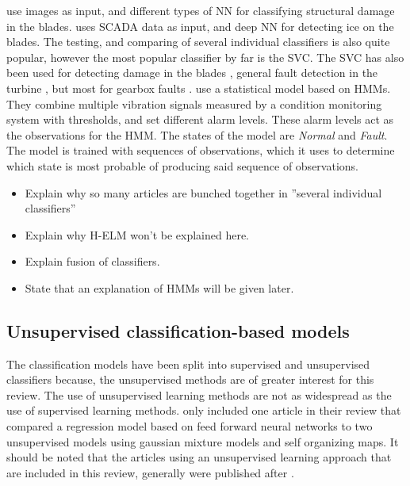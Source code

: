 \textcite{image_based_surface_damage_detection_DL_drone_inspection, image_based_YOLO_YSODA, AI_image_analytics_2_classify_blade_defects, blade_defect_detection_imaging_array} use images as input, and different types of NN for classifying structural damage in the blades. \textcite{deep_learning_for_imbalanced_class_detection_bearing_cm} uses SCADA data as input, and deep NN for detecting ice on the blades. The testing, and comparing of several individual classifiers is also quite popular, however the most popular classifier by far is the SVC. The SVC has also been used for detecting damage in the blades \cite{blade_damage_detection_sup_ml_alg}, general fault detection in the turbine \cite{fault_classification_using_CSO_SVM}, but most for gearbox faults \cite{VMD_MPE_COVAL_fault_detection_gearbox,vibration_acustic_decision_tree_SVM_gearbox, integrated_cm_bearing_fault_wt_gearbox, roller_bearings_cm_fisher_score_and_permutation_entropy}. \textcite{fault_monitoring_HMM} use a statistical model based on HMMs. They combine multiple vibration signals measured by a condition monitoring system with thresholds, and set different alarm levels. These alarm levels act as the observations for the HMM. The states of the model are \textit{Normal} and \textit{Fault}. The model is trained with sequences of observations, which it uses to determine which state is most probable of producing said sequence of observations. 

\begin{itemize}
    \item Explain why so many articles are bunched together in ''several individual classifiers''
    \item Explain why H-ELM won't be explained here. 
    \item Explain fusion of classifiers.
    \item State that an explanation of HMMs will be given later.
\end{itemize}

\newpage
\subsection{Unsupervised classification-based models}
The classification models have been split into supervised and unsupervised classifiers because, the unsupervised methods are of greater interest for this review. The use of unsupervised learning methods are not as widespread as the use of supervised learning methods. \textcite{ml_for_wt_cond_monit_rev} only included one article in their review that compared a regression model based on feed forward neural networks to two unsupervised models using gaussian mixture models and self organizing maps. It should be noted that the articles using an unsupervised learning approach that are included in this review, generally were published after \cite{ml_for_wt_cond_monit_rev}.

